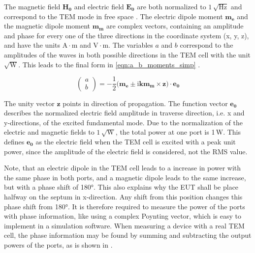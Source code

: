 The magnetic field $\mathbf{H_0}$ and electric field $\mathbf{E_0}$ are both normalized to $1\,\sqrt{\mathrm{Hz}}$ \cite{Kreindl_Bauernfeind_Weiss_Stockreiter_Kaltenbacher_2024} and correspond to the TEM mode in free space \cite{Sreenivasiah_Chang_Ma_1981}. The electric dipole moment $\mathbf{m_e}$ and the magnetic dipole moment $\mathbf{m_m}$ are complex vectors, containing an amplitude and phase for every one of the three directions in the coordinate system (x, y, z), and have the units $\mathrm{A\cdot m}$ and $\mathrm{V\cdot m}$. The variables $a$ and $b$ correspond to the amplitudes of the waves in both possible directions in the TEM cell with the unit $\sqrt{\mathrm{W}}$.
This leads to the final form in \autoref{eqn:a_b_moments_simp} \cite{Sreenivasiah_Chang_Ma_1981}.

\begin{equation}
    \begin{pmatrix}a \\b\end{pmatrix} =-\frac{1}{2}(\mathbf{m_e\pm \mathrm{i}k\mathbf{m_m}\times \mathbf{z})\cdot \mathbf{e_0}}
    \label{eqn:a_b_moments_simp}
\end{equation}

The unity vector $\mathbf{z}$ points in direction of propagation. The function vector $\mathbf{e_0}$ describes the normalized electric field amplitude in traverse direction, i.e. x and y-directions, of the excited fundamental mode. Due to the normalization of the electric and magnetic fields to $1\,\sqrt{\mathrm{W}}$, the total power at one port is 1\,W. This defines $\mathbf{e_0}$ as the electric field when the TEM cell is excited with a peak unit power, since the amplitude of the electric field is considered, not the RMS value.

Note, that an electric dipole in the TEM cell leads to a increase in power with the same phase in both ports, and a magnetic dipole leads to the same increase, but with a phase shift of 180°. This also explains why the EUT shall be place halfway on the septum in x-direction. Any shift from this position changes this phase shift from 180°. It is therefore required to measure the power of the ports with phase information, like using a complex Poynting vector, which is easy to implement in a simulation software. When measuring a device with a real TEM cell, the phase information may be found by summing and subtracting the output powers of the ports, as is shown in \cite{Sreenivasiah_Chang_Ma_1981}.

